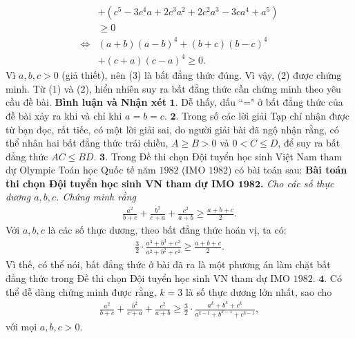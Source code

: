 \begin{multicols}{2}
\begin{align*}
			 &+ \left(\! {{c^5} \!-\! 3{c^4}a \!+\! 2{c^3}{a^2} \!+\! 2{c^2}{a^3} \!-\! 3c{a^4} \!+\! {a^5}}\! \right)\\
			 &\ge 0\\
			\Leftrightarrow &\left( {a + b} \right){\left( {a - b} \right)^4} + \left( {b + c} \right){\left( {b - c} \right)^4} \\
			&+ \left( {c + a} \right){\left( {c - a} \right)^4} \ge 0. \tag{$3$}
	\end{align*}
	Vì $a, b, c > 0$ (giả thiết), nên ($3$) là bất đẳng thức đúng. Vì vậy, ($2$) được chứng minh.
	\vskip 0.05cm
	Từ ($1$) và ($2$), hiển nhiên suy ra bất đẳng thức cần chứng minh theo yêu cầu đề bài.
	\vskip 0.05cm
	\textbf{\color{thachthuctoanhoc}Bình luận và Nhận xét}
	\vskip 0.05cm
	$\pmb{1.}$ Dễ thấy, dấu ``=" ở bất đẳng thức của đề bài xảy ra khi và chỉ khi $a = b = c.$
	\vskip 0.05cm
	$\pmb{2.}$ Trong số các lời giải Tạp chí nhận được từ bạn đọc, rất tiếc, có một lời giải sai, do người giải bài đã ngộ nhận rằng, có thể nhân hai bất đẳng thức trái chiều, $A \ge B > 0$ và $0 < C \le D$, để suy ra bất đẳng thức $AC \le BD$.
	\vskip 0.05cm
	$\pmb{3.}$ Trong Đề thi chọn Đội tuyển học sinh Việt Nam tham dự Olympic Toán học Quốc tế năm $1982$ (IMO $1982$) có bài toán sau:
	\vskip 0.05cm
	\textbf{\color{thachthuctoanhoc}Bài toán thi chọn Đội tuyển học sinh VN tham dự IMO $\pmb{1982}$.} \textit{Cho các số thực dương $a, b, c$. Chứng minh rằng}
	\begin{align*}
		\frac{{{a^2}}}{{b + c}} + \frac{{{b^2}}}{{c + a}} + \frac{{{c^2}}}{{a + b}} \ge \frac{{a + b + c}}{2}.
	\end{align*}
	Với $a, b, c$ là các số thực dương, theo bất đẳng thức hoán vị, ta có:
	\begin{align*}
		\frac{3}{2} \cdot \frac{{{a^3} + {b^3} + {c^3}}}{{{a^2} + {b^2} + {c^2}}} \ge \frac{{a + b + c}}{2}.
	\end{align*}
	Vì thế, có thể nói, bất đẳng thức ở bài đã ra là một phương án làm chặt bất đẳng thức trong Đề thi chọn Đội tuyển học sinh VN tham dự IMO $1982$.
	\vskip 0.05cm
	$\pmb{4.}$ Có thể dễ dàng chứng minh được rằng, $k = 3$ là số thực dương lớn nhất, sao cho
	\begin{align*}
		\frac{{{a^2}}}{{b \!+\! c}} \!+\! \frac{{{b^2}}}{{c \!+\! a}} \!+\! \frac{{{c^2}}}{{a \!+\! b}} \!\ge\! \frac{3}{2} \!\cdot\! \frac{{{a^k} \!+\! {b^k} \!+\! {c^k}}}{{{a^{k \!-\! 1}} \!+\! {b^{k \!-\! 1}} \!+\! {c^{k \!-\! 1}}}},
	\end{align*}
	với mọi $a, b, c > 0$.
	\begin{flushright}

\end{flushright}
\end{multicols}
